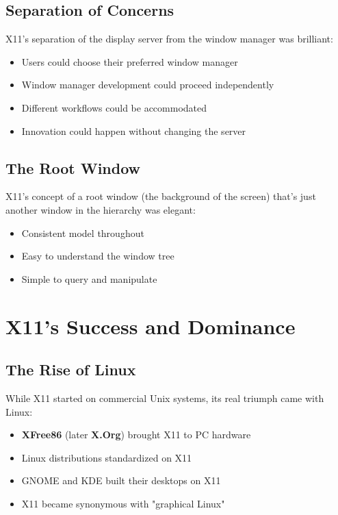 \subsection{Separation of Concerns}

X11's separation of the display server from the window manager was brilliant:

\begin{itemize}[leftmargin=*]
    \item Users could choose their preferred window manager
    \item Window manager development could proceed independently
    \item Different workflows could be accommodated
    \item Innovation could happen without changing the server
\end{itemize}

\subsection{The Root Window}

X11's concept of a root window (the background of the screen) that's just another window in the hierarchy was elegant:

\begin{itemize}[leftmargin=*]
    \item Consistent model throughout
    \item Easy to understand the window tree
    \item Simple to query and manipulate
\end{itemize}

\section{X11's Success and Dominance}

\subsection{The Rise of Linux}

While X11 started on commercial Unix systems, its real triumph came with Linux:

\begin{itemize}[leftmargin=*]
    \item \textbf{XFree86} (later \textbf{X.Org}) brought X11 to PC hardware
    \item Linux distributions standardized on X11
    \item GNOME and KDE built their desktops on X11
    \item X11 became synonymous with "graphical Linux"
\end{itemize}

